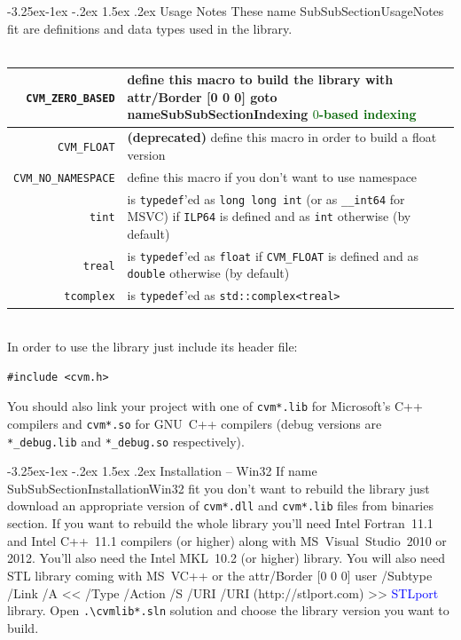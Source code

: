 \documentclass[12pt,letterpaper]{article}
\makeatletter
\newcommand{\URL}[2]{%
    \pdfstartlink attr{/Border [0 0 0]} user{%
    /Subtype /Link
    /A <<
        /Type /Action
        /S /URI
        /URI (#2)
    >>}%
\textcolor{blue}{#1}%
\pdfendlink}
\newcommand{\GO}[2]{%
\pdfstartlink attr{/Border [0 0 0]}%
goto name{#2}%
\textcolor{darkgreen}{#1}%
\pdfendlink}
\newcommand{\Code}[1]{\texttt{#1}}
\renewcommand\subsubsection{\@startsection{subsubsection}{3}{0mm}%
                                     {-3.25ex\@plus -1ex \@minus -.2ex}%
                                     {1.5ex \@plus .2ex}%
                                     {\normalfont\normalsize\bfseries\sffamily}}
\makeatother
\begin{document}
\subsubsection{Usage Notes}
These%
\pdfdest name {SubSubSectionUsageNotes} fit{}
are definitions and data types used in the library.\\
\phantom{1em}\\
\begin{tabularx}{\textwidth}{|r|Y|} \hline
\Code{CVM\_ZERO\_BASED} & define this macro to build the library with \GO{$0$-based indexing}{SubSubSectionIndexing}
\\ %
\hline
\Code{CVM\_FLOAT} & \textbf{(deprecated)} define this macro in order to build a float version
\\ %
\hline
\Code{CVM\_NO\_NAMESPACE} & define this macro
if you don't want to use namespace
\\ %
\hline
\Code{tint} & is \Code{typedef}'ed as \Code{long long int} (or as \Code{\_\_int64} for MSVC)
if \Code{ILP64} is defined and as \Code{int} otherwise (by default)
\\ %
\hline
\Code{treal} & is \Code{typedef}'ed as \Code{float}
if \Code{CVM\_FLOAT} is defined and as \Code{double} otherwise (by default)
\\ %
\hline
\Code{tcomplex} & is \Code{typedef}'ed as
\Code{std::complex<treal>}
\\ %
\hline
\end{tabularx}
\phantom{1em}\\
In order to use the library just include its header file:
\begin{Verbatim}
#include <cvm.h>
\end{Verbatim}
You should also link your project with one of \verb"cvm*.lib"
for Microsoft's C++ compilers
and \verb"cvm*.so" for GNU~C++ compilers
(debug versions are \verb"*_debug.lib" and \verb"*_debug.so"
respectively).

\subsubsection{Installation -- Win32}
If%
\pdfdest name {SubSubSectionInstallationWin32} fit{}
you don't want to rebuild the library just download
an appropriate version of \verb"cvm*.dll" and \verb"cvm*.lib" files
from binaries section.
If you want to rebuild the whole library you'll
need Intel Fortran~11.1 and Intel C++~11.1 compilers (or higher)
along with MS~Visual~Studio~2010 or 2012.
You'll also need
the Intel MKL~10.2 (or higher) library.
You will also need STL library 
coming with MS~VC++ or
the \URL{STLport}{http://stlport.com} library.
Open \verb".\cvmlib*.sln" solution
and choose the library version you want to build.
\end{document}
